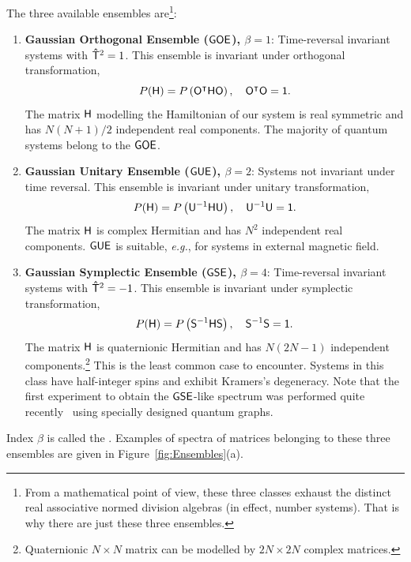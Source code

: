 \documentclass[a4paper,11pt,twoside]{article}
\begin{document}
    The three available ensembles are\footnote{
        From a mathematical point of view, these three classes exhaust the distinct real associative normed division algebras (in effect, number systems).
        That is why there are just these three ensembles.
    }: 
    \begin{enumerate}
        \item {\bf Gaussian Orthogonal Ensemble ($\mathsf{GOE}$), $\beta=1$}: 
            Time-reversal invariant systems with $\mathsf{\hat{T}}^{2}=1$.
            This ensemble is invariant under orthogonal transformation,
            \begin{equation}\label{eq:PHInvariance}
                P(\mathsf{H})=P\left({\mathsf{O}}^{\intercal}\mathsf{H}\mathsf{O}\right),
                \quad{\mathsf{O}}^{\intercal}\mathsf{O}=\mathsf{1}.
            \end{equation}
            The matrix $\mathsf{H}$ modelling the Hamiltonian of our system is real symmetric and has $N(N+1)/2$ independent real components.
            The majority of quantum systems belong to the $\mathsf{GOE}$.

        \item {\bf Gaussian Unitary Ensemble ($\mathsf{GUE}$), $\beta=2$}: 
            Systems not invariant under time reversal.
            This ensemble is invariant under unitary transformation,
            \begin{equation}
                P(\mathsf{H})=P\left(\mathsf{U}^{-1}\mathsf{H}\mathsf{U}\right),
                \quad\mathsf{U}^{-1}\mathsf{U}=\mathsf{1}.
            \end{equation}
            The matrix $\mathsf{H}$ is complex Hermitian and has $N^{2}$ independent real components.
            $\mathsf{GUE}$ is suitable, \emph{e.g.}, for systems in external magnetic field.
        
        \item {\bf Gaussian Symplectic Ensemble ($\mathsf{GSE}$), $\beta=4$}:
            Time-reversal invariant systems with $\mathsf{\hat{T}}^{2}=-1$.
            This ensemble is invariant under symplectic transformation,
            \begin{equation}
                P(\mathsf{H})=P\left(\mathsf{S}^{-1}\mathsf{H}\mathsf{S}\right),
                \quad\mathsf{S}^{-1}\mathsf{S}=\mathsf{1}.
            \end{equation}
            The matrix $\mathsf{H}$ is quaternionic Hermitian and has $N(2N-1)$ independent components.\footnote{Quaternionic $N\times N$ matrix can be modelled by $2N\times 2N$ complex matrices.}
            This is the least common case to encounter.
            Systems in this class have half-integer spins and exhibit Kramers's degeneracy.
            Note that the first experiment to obtain the $\mathsf{GSE}$-like spectrum was performed quite recently~\cite{Reh16} using specially designed quantum graphs.
    \end{enumerate} 
    Index $\beta$ is called the .
    Examples of spectra of matrices belonging to these three ensembles are given in Figure~\ref{fig:Ensembles}(a). 
\end{document}
